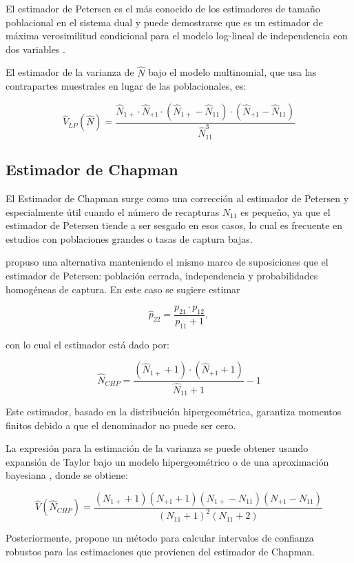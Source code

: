 \documentclass[
  12pt,
]{book}
\begin{document}
El estimador de Petersen es el más conocido de los estimadores de tamaño poblacional en el sistema dual y puede demostrarse que es un estimador de máxima verosimilitud condicional para el modelo log-lineal de independencia con dos variables \citep{fienberg1972multiple, bishop2007discrete}.

El estimador de la varianza de \(\hat{N}\) bajo el modelo multinomial, que usa las contrapartes muestrales en lugar de las poblacionales, es:

\[
\hat{V}_{LP}(\hat{N}) = \frac{\hat{N}_{1+} \cdot \hat{N}_{+1} \cdot (\hat{N}_{1+} - \hat{N}_{11}) \cdot (\hat{N}_{+1} - \hat{N}_{11})}{\hat{N}_{11}^3}
\]

\subsection{Estimador de Chapman}\label{estimador-de-chapman}

El Estimador de Chapman surge como una corrección al estimador de Petersen y especialmente útil cuando el número de recapturas \(N_{11}\) es pequeño, ya que el estimador de Petersen tiende a ser sesgado en esos casos, lo cual es frecuente en estudios con poblaciones grandes o tasas de captura bajas.

\citet{chapman1951some} propuso una alternativa manteniendo el mismo marco de suposiciones que el estimador de Petersen: población cerrada, independencia y probabilidades homogéneas de captura. En este caso se sugiere estimar

\[ \hat{p}_{22} = \frac{p_{21}\cdot p_{12}}{p_{11} + 1},\]

con lo cual el estimador está dado por:

\[\hat{N}_{CHP} = \frac{(\hat{N}_{1+}  + 1) \cdot (\hat{N}_{+1} + 1)}{\hat{N}_{11} + 1} - 1 \]

Este estimador, basado en la distribución hipergeométrica, garantiza momentos finitos debido a que el denominador no puede ser cero.

La expresión para la estimación de la varianza se puede obtener usando expansión de Taylor bajo un modelo hipergeométrico o de una aproximación bayesiana \citep{seber1982estimation}, donde se obtiene:

\[\hat{V}(\hat{N}_{CHP}) = \frac{(N_{1+} + 1)(N_{+1} + 1)(N_{1+} - N_{11})(N_{+1} - N_{11})}{(N_{11} + 1)^2 (N_{11} + 2)}\]

Posteriormente, \citet{sadinle2009transformed} propone un método para calcular intervalos de confianza robustos para las estimaciones que provienen del estimador de Chapman.
\end{document}
